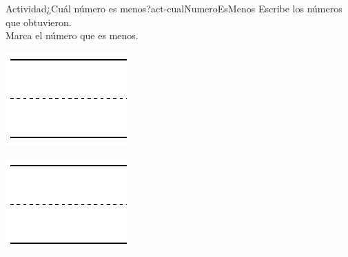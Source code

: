 \documentclass[20pt]{extarticle}
\begin{document}
\begin{activity}{Actividad}{¿Cuál número es menos?}{act-cualNumeroEsMenos}%
Escribe los números que obtuvieron.\\
 Marca el número que es menos.%
\begin{sidebyside}{2}{0.1}{0.1}{0.2}%
\begin{sbspanel}{0.3}%
\includegraphics[max width=\linewidth, center]{external/svg-source/tikz-file-148545.pdf}
\end{sbspanel}%
\begin{sbspanel}{0.3}%
\includegraphics[max width=\linewidth, center]{external/svg-source/tikz-file-148545.pdf}
\end{sbspanel}%
\end{sidebyside}%

\end{activity}
\end{document}
